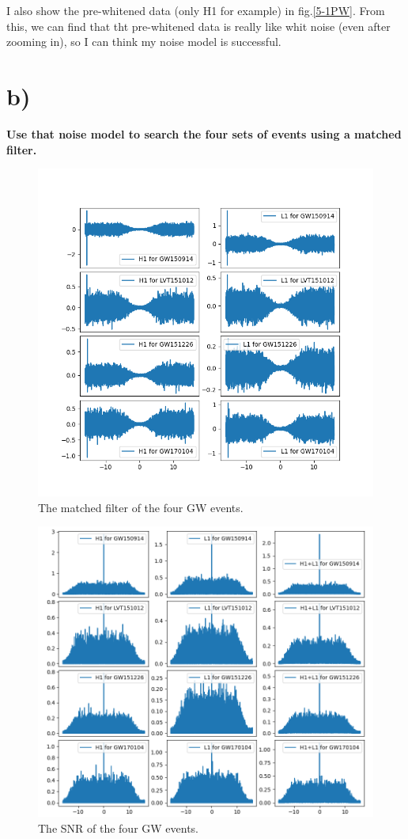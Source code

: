 \documentclass[showpacs, oneside, onecolumn, prl, amsmath, amssymb, nofootinbib, superscriptaddress, notitlepage]{revtex4-1}
\newcommand\bfig{\begin{figure}}
\newcommand\efig{\end{figure}}
\begin{document}
I also show the pre-whitened data (only H1 for example) in fig.\ref{5-1PW}. From this, we can find that tht pre-whitened data is really like whit noise (even after zooming in), so I can think my noise model is successful.


\section{b)}

\textbf{Use that noise model to search the four sets of events using a matched filter. }

\bfig
	\centering
	\includegraphics[scale=0.85]{5-2-1.png}
	\caption{The matched filter of the four GW events.}
	\label{5-2-1}
\efig

\bfig
	\centering
	\includegraphics[scale=0.8]{5-2-2.png}
	\caption{The SNR of the four GW events.}
	\label{5-2-2}
\efig
\end{document}
